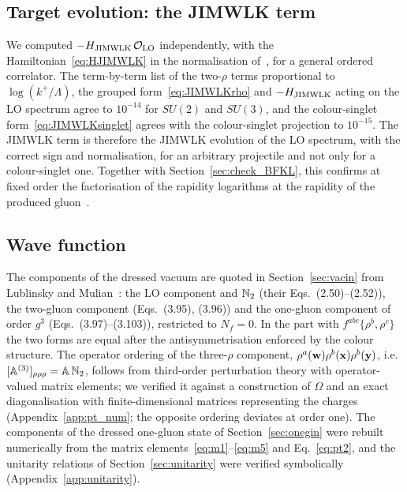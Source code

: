 \subsection{Target evolution: the JIMWLK term}\label{sec:check_JIMWLK}

We computed $-H_{\rm JIMWLK}\,\mathcal O_{\rm LO}$ independently, with the Hamiltonian~\eqref{eq:HJIMWLK} in the normalisation of~\cite{Lublinsky:2016meo,Kovner:2013ona}, for a general ordered correlator. The term-by-term list of the two-$\rho$ terms proportional to $\log(k^+/\Lambda)$, the grouped form~\eqref{eq:JIMWLKrho} and $-H_{\rm JIMWLK}$ acting on the LO spectrum agree to $10^{-14}$ for $SU(2)$ and $SU(3)$, and the colour-singlet form~\eqref{eq:JIMWLKsinglet} agrees with the colour-singlet projection to $10^{-15}$. The JIMWLK term is therefore the JIMWLK evolution of the LO spectrum, with the correct sign and normalisation, for an arbitrary projectile and not only for a colour-singlet one. Together with Section~\ref{sec:check_BFKL}, this confirms at fixed order the factorisation of the rapidity logarithms at the rapidity of the produced gluon~\cite{Kovner:2006wr,Kovner:2006ge,Gelis:2008rw}.

\subsection{Wave function}\label{sec:check_wf}

The components of the dressed vacuum are quoted in Section~\ref{sec:vacin} from Lublinsky and Mulian~\cite{Lublinsky:2016meo}: the LO component and $\mathbb{N}_2$ (their Eqs.~(2.50)--(2.52)), the two-gluon component (Eqs.~(3.95), (3.96)) and the one-gluon component of order $g^3$ (Eqs.~(3.97)--(3.103)), restricted to $N_f=0$. In the part with $f^{abc}\{\rho^b,\rho^c\}$ the two forms are equal after the antisymmetrisation enforced by the colour structure. The operator ordering of the three-$\rho$ component, $\rho^a(\mathbf{w})\rho^b(\mathbf{x})\rho^b(\mathbf{y})$, i.e.\ $[\mathbb{A}^{(3)}]_{\rho\rho\rho}=\mathbb{A}\,\mathbb{N}_2$, follows from third-order perturbation theory with operator-valued matrix elements; we verified it against a construction of $\Omega$ and an exact diagonalisation with finite-dimensional matrices representing the charges (Appendix~\ref{app:pt_num}; the opposite ordering deviates at order one). The components of the dressed one-gluon state of Section~\ref{sec:onegin} were rebuilt numerically from the matrix elements~\eqref{eq:m1}--\eqref{eq:m5} and Eq.~\eqref{eq:pt2}, and the unitarity relations of Section~\ref{sec:unitarity} were verified symbolically (Appendix~\ref{app:unitarity}).

